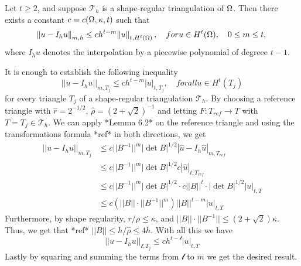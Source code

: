 \begin{thmx}{\quad}
    Let $t \geq 2$, and suppose $\mathcal{T}_h$ is a shape-regular triangulation of $\Omega$. Then there exists a constant $c = c(\Omega, \kappa, t)$ such that
    \begin{equation}
        \norm{u - I_h u}_{m,h} \leq c h^{t-m} \norm{u}_{t, H^t(\Omega)}, \quad for u \in H^t(\Omega), \quad 0 \leq m \leq t,
        \label{eq:6.5}
    \end{equation}
    where $I_h u$ denotes the interpolation by a piecewise polynomial of degreee $t-1$.\label{thm:6.4}
\end{thmx}

\begin{bev}
    It is enough to establish the following inequality
    \begin{equation}
        ||u-I_h u||_{m,T_j} \leq c h^{t-m} |u|_{t,T_j}, \quad for all u \in H^t(T_j)
    \end{equation}
    for every triangle $T_j$ of a shape-regular triangulation $\mathcal{T}_h$. By choosing a reference triangle with $\hat{r} = 2^{-1/2}$, $\hat{\rho} = {(2+\sqrt{2})}^{-1}$ and letting $F : T_{ref} \to T$ with $T = T_j \in \mathcal{T}_h$. We can apply *Lemma 6.2* on the reference triangle and using the transformations formula *ref* in both directions, we get
    \begin{align}
        ||u-I_h u||_{m,T_j} &\leq c ||B^{-1}||^m |\det B |^{1/2} |\hat{u} - I_h \hat{u}|_{m,T_{ref}} \\
                            &\leq c ||B^{-1}||^m |\det B |^{1/2} c | \hat{u} |_{t,T_{ref}} \\
                            &\leq c ||B^{-1}||^m |\det B |^{1/2} \cdot c ||B||^t \cdot |\det B |^{1/2} |u|_{t,T}  \\
                            &\leq c \left( ||B||  \cdot ||B^{-1}||^m \right) ||B||^{t-m} |u|_{t,T}
    \end{align}
    Furthermore, by shape regularity, $r / \rho \leq \kappa$, and $||B|| \cdot ||B^{-1}|| \leq \left( 2 + \sqrt{2} \right)\kappa$. Thus, we get that *ref* $||B|| \leq h/\hat{\rho}\leq 4h$. With all this we have
    \begin{equation}
        ||u-I_h u||_{\mathcal{l},T_j} \leq c h^{t-\mathcal{l}} |u|_{t,T}
    \end{equation}
    Lastly by squaring and summing the terms from $\mathcal{l}$ to $m$ we get the desired result.
\end{bev}
